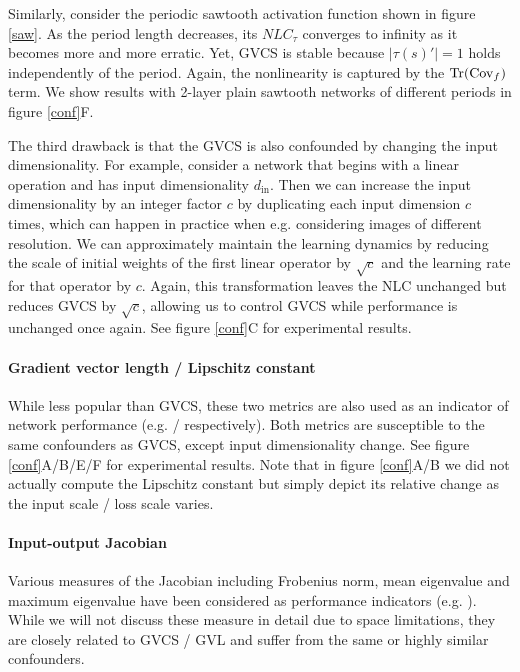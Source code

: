 \documentclass{article} %
\begin{document}
Similarly, consider the periodic sawtooth activation function shown in figure \ref{saw}. As the period length decreases, its $NLC_\tau$ converges to infinity as it becomes more and more erratic. Yet, GVCS is stable because $|\tau(s)'|=1$ holds independently of the period. Again, the nonlinearity is captured by the $\operatorname{Tr}(\mathrm{Cov}_f)$ term. We show results with 2-layer plain sawtooth networks of different periods in figure \ref{conf}F.

The third drawback is that the GVCS is also confounded by changing the input dimensionality. For example, consider a network that begins with a linear operation and has input dimensionality $d_\text{in}$. Then we can increase the input dimensionality by an integer factor $c$ by duplicating each input dimension $c$ times, which can happen in practice when e.g. considering images of different resolution. We can approximately maintain the learning dynamics by reducing the scale of initial weights of the first linear operator by $\sqrt{c}$ and the learning rate for that operator by $c$. Again, this transformation leaves the NLC unchanged but reduces GVCS by $\sqrt{c}$, allowing us to control GVCS while performance is unchanged once again. See figure \ref{conf}C for experimental results.

\paragraph{Gradient vector length / Lipschitz constant}

While less popular than GVCS, these two metrics are also used as an indicator of network performance (e.g. \citet{heInit} / \citet{parseval} respectively). Both metrics are susceptible to the same confounders as GVCS, except input dimensionality change. See figure \ref{conf}A/B/E/F for experimental results. Note that in figure \ref{conf}A/B we did not actually compute the Lipschitz constant but simply depict its relative change as the input scale / loss scale varies.

\paragraph{Input-output Jacobian}

Various measures of the Jacobian including Frobenius norm, mean eigenvalue and maximum eigenvalue have been considered as performance indicators (e.g. \citet{explosionGeneralization,eigenspectrum,explodingPascanu,orthogonalInitialization}).
While we will not discuss these measure in detail due to space limitations, they are closely related to GVCS / GVL and suffer from the same or highly similar confounders.
\end{document}
